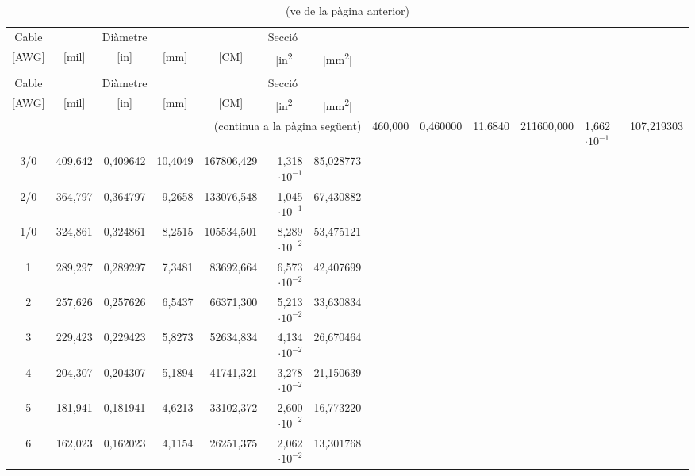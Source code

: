\begin{longtable}{crrrrrr}
\caption{\label{taula:AWG}Dimensions de cables AWG} \\
\toprule[1pt]
    Cable  &    \multicolumn{3}{c}{Di\`{a}metre} &   \multicolumn{3}{c}{Secci\'{o}}         \\
    \cmidrule(rl){2-4} \cmidrule(rl){5-7}
    {[AWG]}  &    \multicolumn{1}{c}{[mil]}  & \multicolumn{1}{c}{[in]}  & \multicolumn{1}{c}{[mm]}
           &    \multicolumn{1}{c}{[CM]} &   \multicolumn{1}{c}{[\unit{in^2}]}  & \multicolumn{1}{c}{[\unit{mm^2}]} \\
\midrule \endfirsthead
\caption[]{(ve de la p\`{a}gina anterior)} \\
\toprule[1pt]
    Cable  &    \multicolumn{3}{c}{Di\`{a}metre} &   \multicolumn{3}{c}{Secci\'{o}}         \\
    \cmidrule(rl){2-4} \cmidrule(rl){5-7}
    {[AWG]}  &    \multicolumn{1}{c}{[mil]}  & \multicolumn{1}{c}{[in]}  & \multicolumn{1}{c}{[mm]}
           &    \multicolumn{1}{c}{[CM]} &   \multicolumn{1}{c}{[\unit{in^2}]}  & \multicolumn{1}{c}{[\unit{mm^2}]} \\
\midrule \endhead
\midrule
\multicolumn{7}{r}{(continua a la p\`{a}gina seg\"{u}ent)}
\endfoot
\endlastfoot
 4/0  &    460,000 &   0,460000 &    11,6840 & 211600,000 &  1,662$\cdot 10^{-1}$ & 107,219303 \\
 3/0  &    409,642 &   0,409642 &    10,4049 & 167806,429 &  1,318$\cdot 10^{-1}$ &  85,028773 \\
 2/0  &    364,797 &   0,364797 &     9,2658 & 133076,548 &  1,045$\cdot 10^{-1}$ &  67,430882 \\
 1/0  &    324,861 &   0,324861 &     8,2515 & 105534,501 &  8,289$\cdot 10^{-2}$ &  53,475121 \\
 1 &    289,297 &   0,289297 &     7,3481 &  83692,664 &  6,573$\cdot 10^{-2}$ &  42,407699 \\
 2 &    257,626 &   0,257626 &     6,5437 &  66371,300 &  5,213$\cdot 10^{-2}$ &  33,630834 \\
 3 &    229,423 &   0,229423 &     5,8273 &  52634,834 &  4,134$\cdot 10^{-2}$ &  26,670464 \\
 4 &    204,307 &   0,204307 &     5,1894 &  41741,321 &  3,278$\cdot 10^{-2}$ &  21,150639 \\
 5 &    181,941 &   0,181941 &     4,6213 &  33102,372 &  2,600$\cdot 10^{-2}$ &  16,773220 \\
 6 &    162,023 &   0,162023 &     4,1154 &  26251,375 &  2,062$\cdot 10^{-2}$ &  13,301768 \\

\end{longtable}

